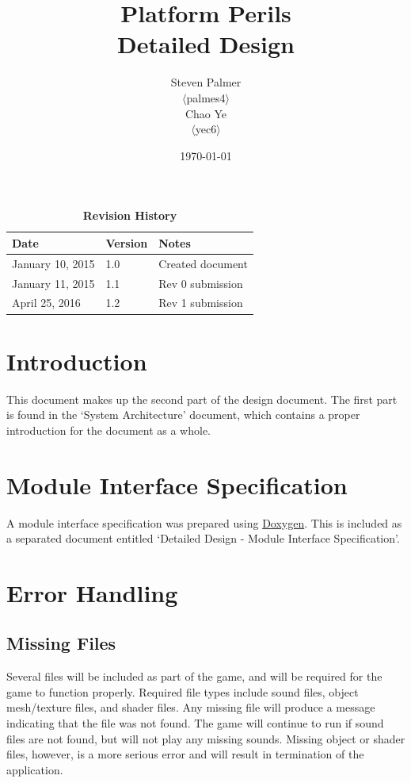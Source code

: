 \documentclass[12pt, titlepage]{article}
\begin{document}
\title{\bf Platform Perils\\[\baselineskip]\Large Detailed Design}
\author{Steven Palmer\\$\langle$palmes4$\rangle$\\Chao Ye\\$\langle$yec6$\rangle$}
\date{\today}
	
\maketitle

\tableofcontents
\listoftables
\listoffigures


\begin{table}[bp]
\caption*{\bf Revision History}
\begin{tabularx}{\textwidth}{p{3.5cm}p{2cm}X}
\toprule {\bf Date} & {\bf Version} & {\bf Notes}\\
\midrule
January 10, 2015 & 1.0 & Created document\\
January 11, 2015 & 1.1 & Rev 0 submission\\
April 25, 2016 & 1.2 & Rev 1 submission\\
\bottomrule
\end{tabularx}
\end{table}

\newpage


\section{Introduction}
This document makes up the second part of the design document.  The first part is found in the `System Architecture' document, which contains a proper introduction for the document as a whole.

\section{Module Interface Specification}
A module interface specification was prepared using \href{www.doxygen.org/}{Doxygen}.  This is included as a separated document entitled `Detailed Design - Module Interface Specification'.



\section{Error Handling}
\subsection{Missing Files}
Several files will be included as part of the game, and will be required for the game to function properly.  Required file types include sound files, object mesh/texture files, and shader files.  Any missing file will produce a message indicating that the file was not found.  The game will continue to run if sound files are not found, but will not play any missing sounds.  Missing object or shader files, however, is a more serious error and will result in termination of the application.
\end{document}
